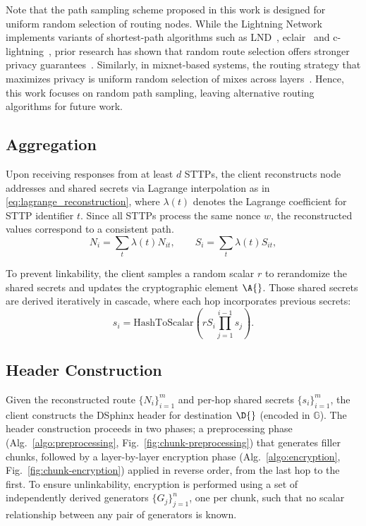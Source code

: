 Note that the path sampling scheme proposed in this work is designed for uniform random selection of routing nodes. 
While the Lightning Network implements variants of shortest-path algorithms such as LND~\cite{lnd2020}, eclair~\cite{eclair2020} and c-lightning~\cite{clightning2020}, prior research has shown that random route selection offers stronger privacy guarantees~\cite{sharma2022anonymity,kumble2021lightning,tochner2019hijacking}. 
Similarly, in mixnet-based systems, the routing strategy that maximizes privacy is uniform random selection of mixes across layers~\cite{benguirat2022mixnet,benguirat2021mixim}. 
Hence, this work focuses on random path sampling, leaving alternative routing algorithms for future work.

\subsection{Aggregation}

Upon receiving responses from at least $d$ STTPs, the client reconstructs node addresses and shared secrets via Lagrange interpolation as in \eqref{eq:lagrange_reconstruction},
where $\lambda(t)$ denotes the Lagrange coefficient for STTP identifier $t$.
Since all STTPs process the same nonce $w$, the reconstructed values correspond to a consistent path.
\begin{equation}
    N_i = \sum_t \lambda(t) N_{it}, \qquad
    S_i = \sum_t \lambda(t) S_{it},
    \label{eq:lagrange_reconstruction}
\end{equation}

To prevent linkability, the client samples a random scalar $r$ to rerandomize the shared secrets and updates the cryptographic element $\A{}$.
Those shared secrets are derived iteratively in cascade, where each hop incorporates previous secrets:
\begin{equation*}
    s_i = \text{HashToScalar}\!\left(r S_i \prod_{j=1}^{i-1} s_j \right).
    \label{eq:cascade_secret}
\end{equation*}


\subsection{Header Construction}
Given the reconstructed route $\{N_i\}_{i=1}^{m}$ and per-hop shared secrets $\{s_i\}_{i=1}^{m}$, the client constructs the DSphinx header for destination $\D{}$ (encoded in $\mathbb{G}$).
The header construction proceeds in two phases; 
a preprocessing phase (Alg.~\ref{algo:preprocessing}, Fig.~\ref{fig:chunk-preprocessing}) that generates filler chunks, 
followed by a layer-by-layer encryption phase (Alg.~\ref{algo:encryption}, Fig.~\ref{fig:chunk-encryption}) applied in reverse order, from the last hop to the first.
To ensure unlinkability, encryption is performed using a set of independently derived generators $\{G_j\}_{j=1}^{n}$, one per chunk, such that no scalar relationship between any pair of generators is known.

